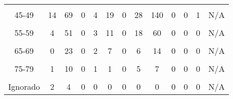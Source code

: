 {\begin{tabular}[t]{ccccccccccccc}
		\cellcolor[HTML]{B6B3FF}{40-44} & \cellcolor[HTML]{B6B3FF}{13} & \cellcolor[HTML]{B6B3FF}{87} & \cellcolor[HTML]{B6B3FF}{0} & \cellcolor[HTML]{B6B3FF}{4} & \cellcolor[HTML]{B6B3FF}{28} & \cellcolor[HTML]{B6B3FF}{0} & \cellcolor[HTML]{B6B3FF}{48} & \cellcolor[HTML]{B6B3FF}{245} & \cellcolor[HTML]{B6B3FF}{0} & \cellcolor[HTML]{B6B3FF}{0} & \cellcolor[HTML]{B6B3FF}{0} & \cellcolor[HTML]{B6B3FF}{N/A}\\
		45-49 & 14 & 69 & 0 & 4 & 19 & 0 & 28 & 140 & 0 & 0 & 1 & N/A\\
		\cellcolor[HTML]{B6B3FF}{50-54} & \cellcolor[HTML]{B6B3FF}{5} & \cellcolor[HTML]{B6B3FF}{46} & \cellcolor[HTML]{B6B3FF}{0} & \cellcolor[HTML]{B6B3FF}{2} & \cellcolor[HTML]{B6B3FF}{10} & \cellcolor[HTML]{B6B3FF}{0} & \cellcolor[HTML]{B6B3FF}{20} & \cellcolor[HTML]{B6B3FF}{97} & \cellcolor[HTML]{B6B3FF}{0} & \cellcolor[HTML]{B6B3FF}{0} & \cellcolor[HTML]{B6B3FF}{0} & \cellcolor[HTML]{B6B3FF}{N/A}\\
		55-59 & 4 & 51 & 0 & 3 & 11 & 0 & 18 & 60 & 0 & 0 & 0 & N/A\\
		\cellcolor[HTML]{B6B3FF}{60-64} & \cellcolor[HTML]{B6B3FF}{1} & \cellcolor[HTML]{B6B3FF}{36} & \cellcolor[HTML]{B6B3FF}{0} & \cellcolor[HTML]{B6B3FF}{1} & \cellcolor[HTML]{B6B3FF}{9} & \cellcolor[HTML]{B6B3FF}{0} & \cellcolor[HTML]{B6B3FF}{5} & \cellcolor[HTML]{B6B3FF}{49} & \cellcolor[HTML]{B6B3FF}{0} & \cellcolor[HTML]{B6B3FF}{0} & \cellcolor[HTML]{B6B3FF}{0} & \cellcolor[HTML]{B6B3FF}{N/A}\\
		65-69 & 0 & 23 & 0 & 2 & 7 & 0 & 6 & 14 & 0 & 0 & 0 & N/A\\
		\cellcolor[HTML]{B6B3FF}{70-74} & \cellcolor[HTML]{B6B3FF}{2} & \cellcolor[HTML]{B6B3FF}{17} & \cellcolor[HTML]{B6B3FF}{0} & \cellcolor[HTML]{B6B3FF}{2} & \cellcolor[HTML]{B6B3FF}{6} & \cellcolor[HTML]{B6B3FF}{0} & \cellcolor[HTML]{B6B3FF}{2} & \cellcolor[HTML]{B6B3FF}{10} & \cellcolor[HTML]{B6B3FF}{0} & \cellcolor[HTML]{B6B3FF}{0} & \cellcolor[HTML]{B6B3FF}{0} & \cellcolor[HTML]{B6B3FF}{N/A}\\
		75-79 & 1 & 10 & 0 & 1 & 1 & 0 & 5 & 7 & 0 & 0 & 0 & N/A\\
		\cellcolor[HTML]{B6B3FF}{80 y más} & \cellcolor[HTML]{B6B3FF}{2} & \cellcolor[HTML]{B6B3FF}{10} & \cellcolor[HTML]{B6B3FF}{0} & \cellcolor[HTML]{B6B3FF}{0} & \cellcolor[HTML]{B6B3FF}{3} & \cellcolor[HTML]{B6B3FF}{0} & \cellcolor[HTML]{B6B3FF}{0} & \cellcolor[HTML]{B6B3FF}{8} & \cellcolor[HTML]{B6B3FF}{1} & \cellcolor[HTML]{B6B3FF}{0} & \cellcolor[HTML]{B6B3FF}{0} & \cellcolor[HTML]{B6B3FF}{N/A}\\
		Ignorado & 2 & 4 & 0 & 0 & 0 & 0 & 0 & 0 & 0 & 0 & 0 & N/A\\
		\bottomrule
	\end{tabular}}